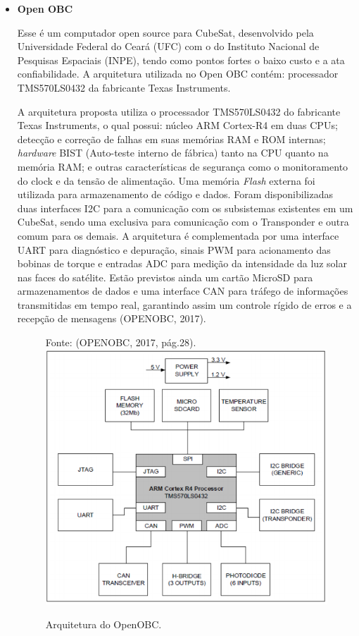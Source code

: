 \begin{itemize}
\newpage
\item \textbf{Open OBC}

Esse é um computador open source para CubeSat, desenvolvido pela Universidade Federal do Ceará (UFC) com o do Instituto Nacional de Pesquisas Espaciais (INPE), tendo como pontos fortes o baixo custo e a ata confiabilidade. A arquitetura utilizada no Open OBC  contém: processador TMS570LS0432 da fabricante Texas Instruments.

A arquitetura proposta utiliza o processador TMS570LS0432 do fabricante Texas Instruments, o qual possui: núcleo ARM Cortex-R4 em duas CPUs; detecção e correção de falhas em suas memórias RAM e ROM internas; \textit{hardware} BIST (Auto-teste interno de fábrica) tanto na CPU quanto na memória RAM; e outras características de segurança como o monitoramento do clock e da tensão de alimentação. Uma memória \textit{Flash} externa foi utilizada para armazenamento de código e dados. Foram disponibilizadas duas interfaces I2C para a comunicação com os subsistemas existentes em um CubeSat, sendo uma exclusiva para comunicação com o Transponder e outra comum para os demais. A arquitetura é complementada por uma interface UART para diagnóstico e depuração, sinais PWM para acionamento das bobinas de torque e entradas ADC para medição da intensidade da luz solar nas faces do satélite. Estão previstos ainda um cartão MicroSD para armazenamentos de dados e uma interface CAN para tráfego de informações transmitidas em tempo real, garantindo assim um controle rígido de erros e a recepção de mensagens (OPENOBC, 2017).

\begin{figure}[h]
	\centering
    Fonte: (OPENOBC, 2017, pág.28). \linebreak
	\includegraphics[keepaspectratio=true,scale=0.55]{figuras/openObc.PNG}
	\caption{Arquitetura do OpenOBC.}
	\label{fig13}
\end{figure}


\end{itemize}

